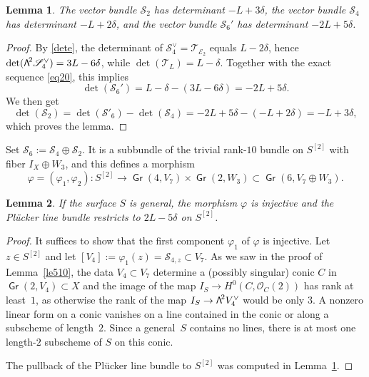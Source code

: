 \documentclass[11pt]{article}
\let\mathcal\mathscr
\newtheorem{lemm}{Lemma}[section]
\theoremstyle{definition}
\newcommand\cE{\mathcal{E}}
\newcommand\cO{\mathcal{O}}\let\OO\cO
\newcommand\cS{\mathcal{S}}\let\soustauto\cS
\newcommand\cT{\mathcal{T}}
\DeclareMathOperator{\Gr}{\mathsf{Gr}}
\let\phi\varphi
\let\Ld L
\newcommand\bw[1]{{\hbox{\large$\mathsf{\Lambda}$}^{\!#1}}}
\newcommand\hilbS{S^{[2]}}
\begin{document}
\begin{lemm} \label{lepourrangdeuxpart}
The vector bundle
$\cS_2$ has determinant $-\Ld+3\delta$, the vector bundle
$\cS_4$ has determinant $- \Ld+2\delta$, and the vector bundle
$\cS_6'$ has determinant $-2\Ld+5\delta$.
\end{lemm}

\begin{proof} By \eqref{dete}, the determinant of $\cS_4^\vee=\cT_{\cE_2}$ equals $\Ld-2\delta$, hence $\det (\bw2\cS_4^\vee)=3\Ld-6\delta$, while $\det (\cT_{L})=\Ld-\delta$. Together with the exact sequence \eqref{eq20}, this implies
\begin{equation}\label{dets6}
\det (\cS_6')=\Ld-\delta-(3\Ld-6\delta)=-2\Ld+5\delta.
\end{equation}
We then get
\[
\det (\cS_2)=\det(\cS'_6)-\det(\cS_4)=-2\Ld+5\delta -(-\Ld+2\delta)=-\Ld+3\delta,
\]
which proves the lemma.
\end{proof}

Set $\cS_6:=\cS_4\oplus \cS_2$. It is a subbundle of the trivial rank-$10$ bundle on $\hilbS$ with fiber $I_X\oplus W_3$, and this defines a morphism
\begin{equation}\label{defphi}
\phi=(\phi_1,\phi_2)\colon \hilbS\to \Gr(4,V_7)\times \Gr(2,W_3)\subset \Gr(6,V_7\oplus W_3).
\end{equation}

\begin{lemm} \label{lem513}
If the surface $S$ is general, {the morphism $\phi$ is injective} and the Plücker line bundle restricts to $2\Ld-5\delta$ on $\hilbS$.
\end{lemm}

\begin{proof} It suffices to show that the first component $\phi_1$ of $\phi$ is injective.
Let $z\in\hilbS$ and let $ [V_4]:=\phi_1(z)=\cS_{4,z} \subset V_7$.
As we saw in the proof of Lemma~\ref{le510}, the data $V_4\subset V_7$ determine a (possibly singular) conic $C$ in $ \Gr(2,V_4)\subset X$ and
the image of the map $I_S\to H^0(C,\cO_C(2))$ has rank at least~$1$, as otherwise the rank
of the map $I_S\to \bw2V_4^\vee$ would be only $3$. A nonzero linear form
on a conic vanishes on a line contained in the conic or along a subscheme of length~$2$. Since a general~$S$ contains no lines, there is at most one length-$2$ subscheme
of $S$ on this conic.

The pullback of the Plücker line bundle to $\hilbS$ was computed in Lemma~\ref{lepourrangdeuxpart}.
\end{proof}
\end{document}
